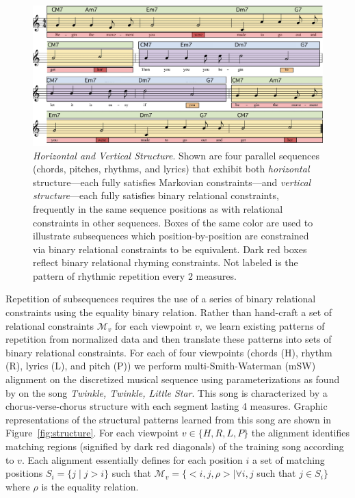 \documentclass[phd,electronic,oneside,twosidetoc,letterpaper,chaptercenter,parttop,lol,lof,lot]{byumsphd}
\begin{document}
\begin{figure}
    \centering
    \includegraphics[width=.8\linewidth]{Song}
    \caption{\textit{Horizontal and Vertical Structure}. Shown are four parallel sequences (chords, pitches, rhythms, and lyrics) that exhibit both \emph{horizontal} structure---each fully satisfies Markovian constraints---and \emph{vertical structure}---each fully satisfies binary relational constraints, frequently in the same sequence positions as with relational constraints in other sequences. Boxes of the same color are used to illustrate subsequences which position-by-position are constrained via binary relational constraints to be equivalent. Dark red boxes reflect binary relational rhyming constraints. Not labeled is the pattern of rhythmic repetition every 2 measures.}
    \label{fig:song}
\end{figure}

Repetition of subsequences requires the use of a series of binary relational constraints using the equality binary relation. Rather than hand-craft a set of relational constraints $\mathcal{M}_{v}$ for each viewpoint $v$, we learn existing patterns of repetition from normalized data and then translate these patterns into sets of binary relational constraints. For each of four viewpoints (chords (H), rhythm (R), lyrics (L), and pitch (P)) we perform multi-Smith-Waterman (mSW) alignment on the discretized musical sequence using parameterizations as found by \cite{bodily2018abstract} on the song \textit{Twinkle, Twinkle, Little Star}. This song is characterized by a chorus-verse-chorus structure with each segment lasting 4 measures. Graphic representations of the structural patterns learned from this song are shown in Figure~\ref{fig:structure}. For each viewpoint $v\in\{H,R,L,P\}$ the alignment identifies matching regions (signified by dark red diagonals) of the training song according to $v$. Each alignment essentially defines for each position $i$ a set of matching positions $S_i=\{j\mid j>i\}$ such that $\mathcal{M}_v =\{<i,j,\rho>\mid \forall i,j$ such that $j\in S_i\}$ where $\rho$ is the equality relation.
\end{document}
